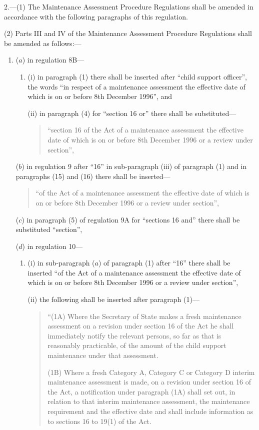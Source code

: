 \documentclass[12pt,a4paper]{article}
\begin{document}
2.—(1) The Maintenance Assessment Procedure Regulations shall be amended in accordance with the following paragraphs of this regulation.

(2) Parts III and IV of the Maintenance Assessment Procedure Regulations shall be amended as follows:—
\begin{enumerate}\item[]
($a$) in regulation 8B—
\begin{enumerate}\item[]
(i) in paragraph (1) there shall be inserted after “child support officer”, the words “in respect of a maintenance assessment the effective date of which is on or before 8th December 1996”, and

(ii) in paragraph (4) for “section 16 or” there shall be substituted—
\begin{quotation}
“section 16 of the Act of a maintenance assessment the effective date of which is on or before 8th December 1996 or a review under section”,
\end{quotation}
\end{enumerate}

($b$) in regulation 9 after “16” in sub-paragraph (iii) of paragraph (1) and in paragraphs (15) and (16) there shall be inserted—
\begin{quotation}
“of the Act of a maintenance assessment the effective date of which is on or before 8th December 1996 or a review under section”,
\end{quotation}

($c$) in paragraph (5) of regulation 9A for “sections 16 and” there shall be substituted “section”,

($d$) in regulation 10—
\begin{enumerate}\item[]
(i) in sub-paragraph ($a$) of paragraph (1) after “16” there shall be inserted “of the Act of a maintenance assessment the effective date of which is on or before 8th December 1996 or a review under section”,

(ii) the following shall be inserted after paragraph (1)—
\begin{quotation}
“(1A) Where the Secretary of State makes a fresh maintenance assessment on a revision under section 16 of the Act he shall immediately notify the relevant persons, so far as that is reasonably practicable, of the amount of the child support maintenance under that assessment.

(1B) Where a fresh Category A, Category C or Category D interim maintenance assessment is made, on a revision under section 16 of the Act, a notification under paragraph (1A) shall set out, in relation to that interim maintenance assessment, the maintenance requirement and the effective date and shall include information as to sections 16 to 19(1) of the Act.


\end{quotation}
\end{enumerate}
\end{enumerate}
\end{document}
